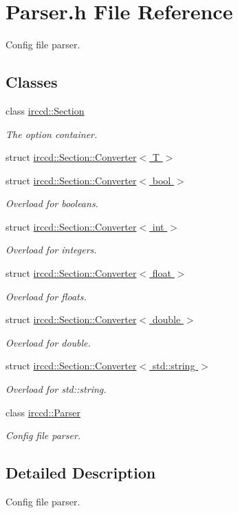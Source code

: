 \hypertarget{a00117}{\section{Parser.\-h File Reference}
\label{a00117}
}


Config file parser.  


\subsection*{Classes}
\begin{DoxyCompactItemize}
\item 
class \hyperlink{a00054}{irccd\-::\-Section}
\begin{DoxyCompactList}\small\item\em The option container. \end{DoxyCompactList}\item 
struct \hyperlink{a00017}{irccd\-::\-Section\-::\-Converter$<$ T $>$}
\item 
struct \hyperlink{a00018}{irccd\-::\-Section\-::\-Converter$<$ bool $>$}
\begin{DoxyCompactList}\small\item\em Overload for booleans. \end{DoxyCompactList}\item 
struct \hyperlink{a00021}{irccd\-::\-Section\-::\-Converter$<$ int $>$}
\begin{DoxyCompactList}\small\item\em Overload for integers. \end{DoxyCompactList}\item 
struct \hyperlink{a00020}{irccd\-::\-Section\-::\-Converter$<$ float $>$}
\begin{DoxyCompactList}\small\item\em Overload for floats. \end{DoxyCompactList}\item 
struct \hyperlink{a00019}{irccd\-::\-Section\-::\-Converter$<$ double $>$}
\begin{DoxyCompactList}\small\item\em Overload for double. \end{DoxyCompactList}\item 
struct \hyperlink{a00022}{irccd\-::\-Section\-::\-Converter$<$ std\-::string $>$}
\begin{DoxyCompactList}\small\item\em Overload for std\-::string. \end{DoxyCompactList}\item 
class \hyperlink{a00048}{irccd\-::\-Parser}
\begin{DoxyCompactList}\small\item\em Config file parser. \end{DoxyCompactList}\end{DoxyCompactItemize}


\subsection{Detailed Description}
Config file parser. 